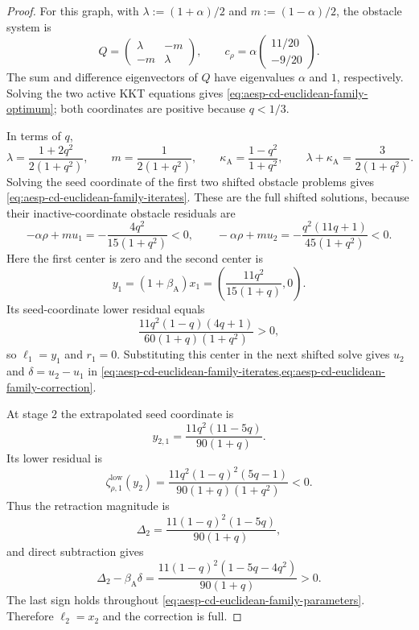 \begin{proof}
For this graph, with
$\lambda:=(1+\alpha)/2$ and $m:=(1-\alpha)/2$, the obstacle system is
\begin{equation*}
 Q=\begin{pmatrix}\lambda&-m\\-m&\lambda\end{pmatrix},
 \qquad
 c_\rho=\alpha\begin{pmatrix}11/20\\-9/20\end{pmatrix}.
\end{equation*}
The sum and difference eigenvectors of $Q$ have eigenvalues $\alpha$ and
$1$, respectively.  Solving the two active KKT equations gives
\cref{eq:aesp-cd-euclidean-family-optimum}; both coordinates are positive
because $q<1/3$.

In terms of $q$,
\begin{equation*}
 \lambda=\frac{1+2q^2}{2(1+q^2)},
 \qquad
 m=\frac1{2(1+q^2)},
 \qquad
 \kappa_{\mathrm A}=\frac{1-q^2}{1+q^2},
 \qquad
 \lambda+\kappa_{\mathrm A}=\frac3{2(1+q^2)}.
\end{equation*}
Solving the seed coordinate of the first two shifted obstacle problems gives
\cref{eq:aesp-cd-euclidean-family-iterates}.  These are the full shifted
solutions, because their inactive-coordinate obstacle residuals are
\begin{equation*}
 -\alpha\rho+m u_1
 =-\frac{4q^2}{15(1+q^2)}<0,
 \qquad
 -\alpha\rho+m u_2
 =-\frac{q^2(11q+1)}{45(1+q^2)}<0.
\end{equation*}
Here the first center is zero and the second center is
\begin{equation*}
 y_1=(1+\beta_{\mathrm A})x_1
 =\left(\frac{11q^2}{15(1+q)},0\right).
\end{equation*}
Its seed-coordinate lower residual equals
\begin{equation*}
 \frac{11q^2(1-q)(4q+1)}
 {60(1+q)(1+q^2)}>0,
\end{equation*}
so $\ell_1=y_1$ and $r_1=0$.  Substituting this center in the next shifted
solve gives $u_2$ and $\delta=u_2-u_1$ in
\cref{eq:aesp-cd-euclidean-family-iterates,eq:aesp-cd-euclidean-family-correction}.

At stage $2$ the extrapolated seed coordinate is
\begin{equation*}
 y_{2,1}=\frac{11q^2(11-5q)}{90(1+q)}.
\end{equation*}
Its lower residual is
\begin{equation*}
 \zeta_{\rho,1}^{\mathrm{low}}(y_2)
 =\frac{11q^2(1-q)^2(5q-1)}
 {90(1+q)(1+q^2)}<0.
\end{equation*}
Thus the retraction magnitude is
\begin{equation*}
 \Delta_2
 =\frac{11(1-q)^2(1-5q)}{90(1+q)},
\end{equation*}
and direct subtraction gives
\begin{equation*}
 \Delta_2-\beta_{\mathrm A}\delta
 =\frac{11(1-q)^2(1-5q-4q^2)}{90(1+q)}>0.
\end{equation*}
The last sign holds throughout \cref{eq:aesp-cd-euclidean-family-parameters}.
Therefore $\ell_2=x_2$ and the correction is full.


\end{proof}

